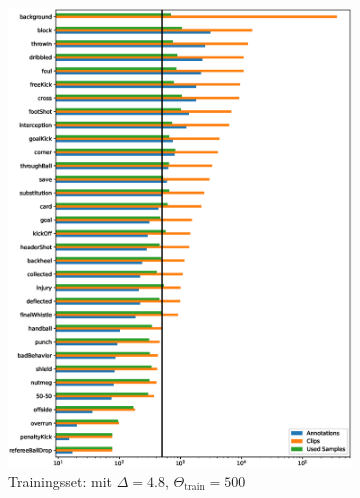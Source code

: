 \begin{figure}
    \centering
    \begin{subfigure}[b]{.33\textwidth}
        \centering
        \includegraphics[width=.95\linewidth]{img/05_class_distribution_train_delta_5_Theta_500.eps}
        \caption{Trainingsset: \newline mit $\Delta=4.8$, $\Theta_{\text{train}}=500$}
    \end{subfigure}%
    \begin{subfigure}[b]{.33\textwidth}
        \centering

\end{subfigure}
\end{figure}
